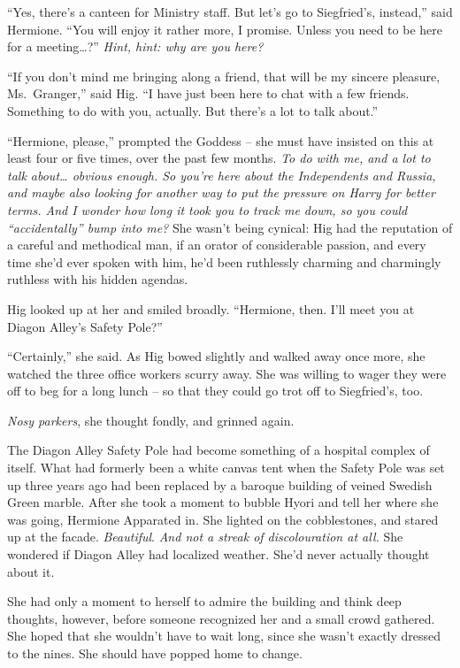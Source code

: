 ``Yes, there's a canteen for Ministry staff. But let's go to
Siegfried's, instead,'' said Hermione. ``You will enjoy it rather more,
I promise. Unless you need to be here for a meeting\ldots?'' \emph{Hint,
hint: why are you here?}

``If you don't mind me bringing along a friend, that will be my sincere
pleasure, Ms.~Granger,'' said Hig. ``I have just been here to chat with
a few friends. Something to do with you, actually. But there's a lot to
talk about.''

``Hermione, please,'' prompted the Goddess -- she must have insisted on
this at least four or five times, over the past few months. \emph{To do
with me, and a lot to talk about\ldots{} obvious enough. So you're here
about the Independents and Russia, and maybe also looking for another
way to put the pressure on Harry for better terms. And I wonder how long
it took you to track me down, so you could ``accidentally'' bump into
me?} She wasn't being cynical: Hig had the reputation of a careful and
methodical man, if an orator of considerable passion, and every time
she'd ever spoken with him, he'd been ruthlessly charming and charmingly
ruthless with his hidden agendas.

Hig looked up at her and smiled broadly. ``Hermione, then. I'll meet you
at Diagon Alley's Safety Pole?''

``Certainly,'' she said. As Hig bowed slightly and walked away once
more, she watched the three office workers scurry away. She was willing
to wager they were off to beg for a long lunch -- so that they could go
trot off to Siegfried's, too.

\emph{Nosy parkers}, she thought fondly, and grinned again.

\mybreak

The Diagon Alley Safety Pole had become something of a hospital complex
of itself. What had formerly been a white canvas tent when the Safety
Pole was set up three years ago had been replaced by a baroque building
of veined Swedish Green marble. After she took a moment to bubble Hyori
and tell her where she was going, Hermione Apparated in. She lighted on
the cobblestones, and stared up at the facade. \emph{Beautiful}.
\emph{And not a streak of discolouration at all.} She wondered if Diagon
Alley had localized weather. She'd never actually thought about it.

She had only a moment to herself to admire the building and think deep
thoughts, however, before someone recognized her and a small crowd
gathered. She hoped that she wouldn't have to wait long, since she
wasn't exactly dressed to the nines. She should have popped home to
change.

